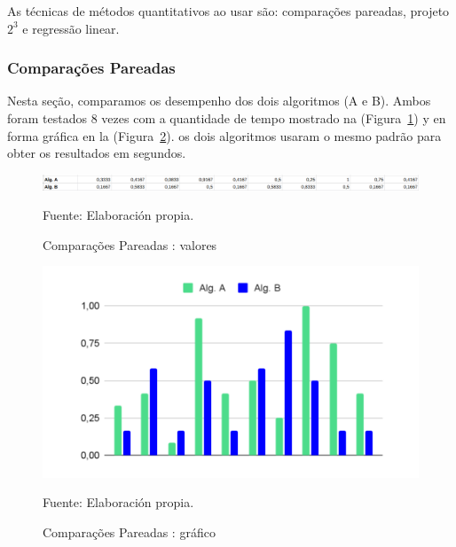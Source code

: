 \documentclass[12pt]{article}
\begin{document}
As técnicas de métodos quantitativos ao usar são: comparações  pareadas, projeto ${2^3}$ e regressão linear.

\subsubsection{Comparações  Pareadas}

Nesta seção, comparamos os desempenho dos dois algoritmos (A e B). Ambos foram testados 8 vezes com a quantidade de tempo mostrado na (Figura~\ref{figure:comparacoes_pareadas_table}) y en forma gráfica en la (Figura~\ref{figure:comparacoes_pareadas_graph}). os dois algoritmos usaram o mesmo padrão para obter os resultados em segundos.

\begin{figure}[!ht]
	\begin{center}
		\includegraphics[width=1\textwidth]{images/comparacoes_pareadas_table}
	\end{center}
	\begin{center}
		\caption{\label{figure:comparacoes_pareadas_table}
			\small{Comparações  Pareadas : valores}}
		{\small{Fuente: Elaboración propia.}}
	\end{center}
\end{figure}


\begin{figure}[!ht]
	\begin{center}
		\includegraphics[width=1\textwidth]{images/comparacoes_pareadas_graph}
	\end{center}
	\begin{center}
		\vskip -0.5cm
		\caption{\label{figure:comparacoes_pareadas_graph}
			\small{Comparações  Pareadas : gráfico}}
		{\small{Fuente: Elaboración propia.}}
	\end{center}
\end{figure}
\end{document}
